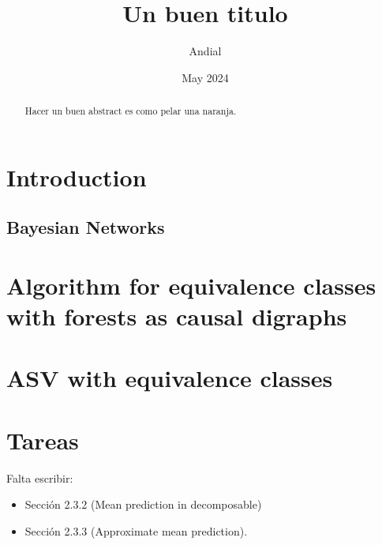 \documentclass{article}
\title{Un buen titulo} %
\author{Andial}
\date{May 2024}
\begin{document}
\maketitle

\begin{abstract}
    Hacer un buen abstract es como pelar una naranja.
\end{abstract}

\tableofcontents

\section{Introduction}





\subsection{Bayesian Networks}

% 

\section{Algorithm for equivalence classes with forests as causal digraphs}

%

\section{ASV with equivalence classes}


\section{Tareas}

Falta escribir:

\begin{itemize}
    \item Sección 2.3.2 (Mean prediction in decomposable)
    \item Sección 2.3.3 (Approximate mean prediction).
\end{itemize}



\end{document}
